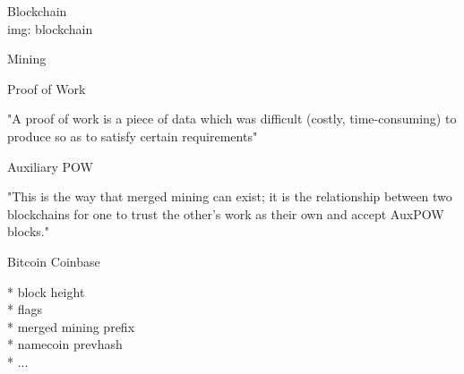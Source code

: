 \documentclass{beamer}
\begin{document}
\begin{frame}

    {\Huge Blockchain}\\

    img: blockchain

\end{frame}

\begin{frame}

    {\Huge Mining}\\

\end{frame}

\begin{frame}

    {\Huge Proof of Work}\\

    \vspace{5mm}

    "A proof of work is a piece of data which was difficult (costly, time-consuming) to produce so as to satisfy certain requirements"\\

\end{frame}

\begin{frame}

    {\Huge Auxiliary POW}\\

    \vspace{5mm}

    "This is the way that merged mining can exist; it is the relationship between two blockchains for one to trust the other's work as their own and accept AuxPOW blocks."\\

\end{frame}

\begin{frame}

    {\Huge Bitcoin Coinbase}\\

    \vspace{5mm}

    * block height\\
    * flags\\
    * merged mining prefix\\
    * namecoin prevhash\\
    * ...\\

\end{frame}
\end{document}
